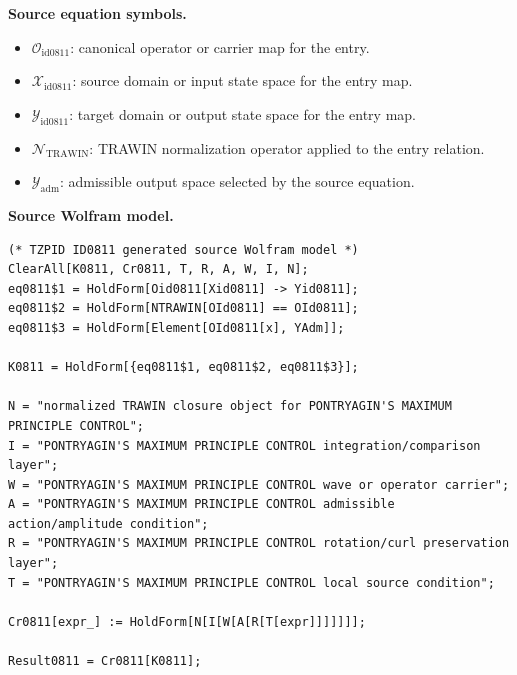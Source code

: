 \begin{minipage}[t]{0.49\linewidth}
\begingroup
\small
\raggedright
\textbf{Source equation symbols.}\par
\begin{itemize}[leftmargin=1.35em,itemsep=1pt,topsep=1pt,parsep=0pt]
    \item $\mathcal{O}_{\mathrm{id0811}}$: canonical operator or carrier map for the entry.
    \item $\mathcal{X}_{\mathrm{id0811}}$: source domain or input state space for the entry map.
    \item $\mathcal{Y}_{\mathrm{id0811}}$: target domain or output state space for the entry map.
    \item $\mathcal{N}_{\mathrm{TRAWIN}}$: TRAWIN normalization operator applied to the entry relation.
    \item $\mathcal{Y}_{\mathrm{adm}}$: admissible output space selected by the source equation.
\end{itemize}
\endgroup
\end{minipage}\hfill
\begin{minipage}[t]{0.47\linewidth}
\begingroup
\scriptsize
\raggedright
\textbf{Source Wolfram model.}\par
\begin{Verbatim}[fontsize=\tiny,breaklines=true,breakanywhere=true]
(* TZPID ID0811 generated source Wolfram model *)
ClearAll[K0811, Cr0811, T, R, A, W, I, N];
eq0811$1 = HoldForm[Oid0811[Xid0811] -> Yid0811];
eq0811$2 = HoldForm[NTRAWIN[OId0811] == OId0811];
eq0811$3 = HoldForm[Element[OId0811[x], YAdm]];

K0811 = HoldForm[{eq0811$1, eq0811$2, eq0811$3}];

N = "normalized TRAWIN closure object for PONTRYAGIN'S MAXIMUM PRINCIPLE CONTROL";
I = "PONTRYAGIN'S MAXIMUM PRINCIPLE CONTROL integration/comparison layer";
W = "PONTRYAGIN'S MAXIMUM PRINCIPLE CONTROL wave or operator carrier";
A = "PONTRYAGIN'S MAXIMUM PRINCIPLE CONTROL admissible action/amplitude condition";
R = "PONTRYAGIN'S MAXIMUM PRINCIPLE CONTROL rotation/curl preservation layer";
T = "PONTRYAGIN'S MAXIMUM PRINCIPLE CONTROL local source condition";

Cr0811[expr_] := HoldForm[N[I[W[A[R[T[expr]]]]]]];

Result0811 = Cr0811[K0811];
\end{Verbatim}
\endgroup
\end{minipage}

